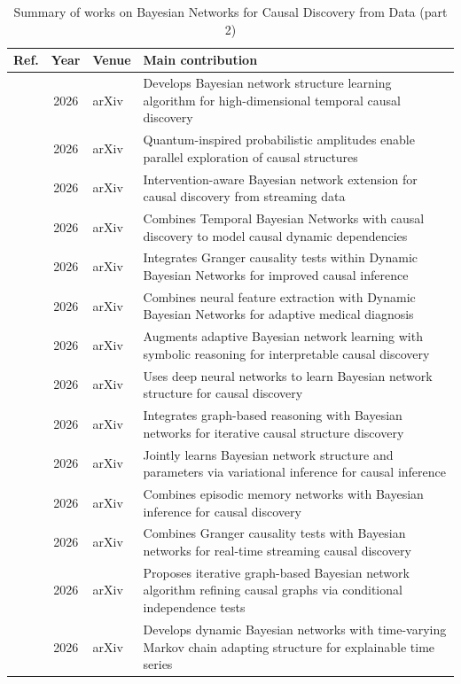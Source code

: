 \begin{table}[!t]
\centering
\renewcommand{\arraystretch}{1.2}
\caption{Summary of works on Bayesian Networks for Causal Discovery from Data (part 2)}
\begin{tabularx}{\textwidth}{@{}l c p{3.6cm} X@{}}
\toprule
\textbf{Ref.} & \textbf{Year} & \textbf{Venue} & \textbf{Main contribution} \\
\midrule
\cite{zhang2026causalk} & 2026 & arXiv & Develops Bayesian network structure learning algorithm for high-dimensional temporal causal discovery \\
\cite{zhang2026quantum} & 2026 & arXiv & Quantum-inspired probabilistic amplitudes enable parallel exploration of causal structures \\
\cite{zhang2026causall} & 2026 & arXiv & Intervention-aware Bayesian network extension for causal discovery from streaming data \\
\cite{zhang2026temporal} & 2026 & arXiv & Combines Temporal Bayesian Networks with causal discovery to model causal dynamic dependencies \\
\cite{zhang2026causalm} & 2026 & arXiv & Integrates Granger causality tests within Dynamic Bayesian Networks for improved causal inference \\
\cite{zhang2026neuro} & 2026 & arXiv & Combines neural feature extraction with Dynamic Bayesian Networks for adaptive medical diagnosis \\
\cite{zhang2026adaptive} & 2026 & arXiv & Augments adaptive Bayesian network learning with symbolic reasoning for interpretable causal discovery \\
\cite{zhang2026causalo} & 2026 & arXiv & Uses deep neural networks to learn Bayesian network structure for causal discovery \\
\cite{zhang2026graph} & 2026 & arXiv & Integrates graph-based reasoning with Bayesian networks for iterative causal structure discovery \\
\cite{zhang2026causalp} & 2026 & arXiv & Jointly learns Bayesian network structure and parameters via variational inference for causal inference \\
\cite{zhang2026causalq} & 2026 & arXiv & Combines episodic memory networks with Bayesian inference for causal discovery \\
\cite{zhang2026causalr} & 2026 & arXiv & Combines Granger causality tests with Bayesian networks for real-time streaming causal discovery \\
\cite{zhang2026graphb} & 2026 & arXiv & Proposes iterative graph-based Bayesian network algorithm refining causal graphs via conditional independence tests \\
\cite{zhang2026dynamicc} & 2026 & arXiv & Develops dynamic Bayesian networks with time-varying Markov chain adapting structure for explainable time series \\
\bottomrule
\end{tabularx}
\end{table}

